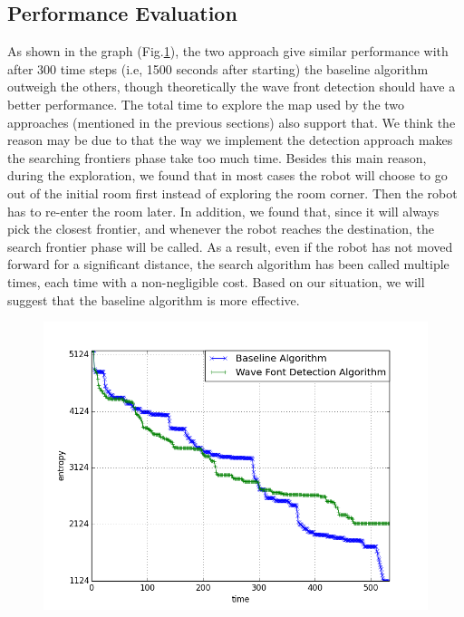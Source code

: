 \documentclass{article}
\begin{document}
\subsection{Performance Evaluation}
As shown in the graph (Fig.\ref{fig:entropyGraph}), the two approach give similar performance with after 300 time steps (i.e, 1500 seconds after starting) the baseline algorithm outweigh the others, though theoretically the wave front detection should have a better performance. The total time to explore the map used by the two approaches (mentioned in the previous sections) also support that. We think the reason may be due to that the way we implement the detection approach makes the searching frontiers phase take too much time. Besides this main reason, during the exploration, we found that in most cases the robot will choose to go out of the initial room first instead of exploring the room corner. Then the robot has to re-enter the room later. In addition, we found that, since it will always pick the closest frontier, and whenever the robot reaches the destination, the search frontier phase will be called. As a result, even if the robot has not moved forward for a significant distance, the search algorithm has been called multiple times,  each time with a non-negligible cost. Based on our situation, we will suggest that the baseline algorithm is more effective.

\begin{figure}[ht]
\centering
\includegraphics[scale=0.5]{graphs/part4/4-3/entropy.png}
\caption{}
\label{fig:entropyGraph}
\end{figure}
\end{document}

